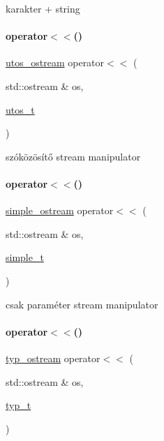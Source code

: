 karakter + string 

\mbox{\label{schtring_8hpp_a43aac73473ffa53d46bd5f53f0570e3e}} 
\paragraph{\texorpdfstring{operator$<$$<$()}{operator<<()}\hspace{0.1cm}{\footnotesize\ttfamily [1/8]}}
{\footnotesize\ttfamily \mbox{\hyperlink{structutos__ostream}{utos\+\_\+ostream}} operator$<$$<$ (\begin{DoxyParamCaption}\item[{std\+::ostream \&}]{os,  }\item[{\mbox{\hyperlink{structutos__t}{utos\+\_\+t}}}]{ }\end{DoxyParamCaption})\hspace{0.3cm}{\ttfamily [inline]}}



szóközösítő stream manipulator 

\mbox{\label{schtring_8hpp_aea28f4c85e19de48a35b1479e9cc192f}} 
\paragraph{\texorpdfstring{operator$<$$<$()}{operator<<()}\hspace{0.1cm}{\footnotesize\ttfamily [2/8]}}
{\footnotesize\ttfamily \mbox{\hyperlink{structsimple__ostream}{simple\+\_\+ostream}} operator$<$$<$ (\begin{DoxyParamCaption}\item[{std\+::ostream \&}]{os,  }\item[{\mbox{\hyperlink{structsimple__t}{simple\+\_\+t}}}]{ }\end{DoxyParamCaption})\hspace{0.3cm}{\ttfamily [inline]}}



csak paraméter stream manipulator 

\mbox{\label{schtring_8hpp_a4d21dd8939fd627f88d08115283381b8}} 
\paragraph{\texorpdfstring{operator$<$$<$()}{operator<<()}\hspace{0.1cm}{\footnotesize\ttfamily [3/8]}}
{\footnotesize\ttfamily \mbox{\hyperlink{structtyp__ostream}{typ\+\_\+ostream}} operator$<$$<$ (\begin{DoxyParamCaption}\item[{std\+::ostream \&}]{os,  }\item[{\mbox{\hyperlink{structtyp__t}{typ\+\_\+t}}}]{ }\end{DoxyParamCaption})\hspace{0.3cm}{\ttfamily [inline]}}



